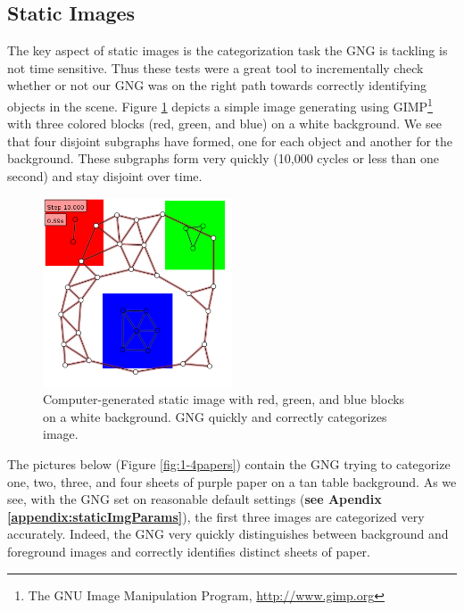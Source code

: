 \documentclass{article}
\renewcommand{\|}{\origbar} %
\begin{document}
\subsection{Static Images}


The key aspect of static images is the categorization task the GNG is tackling is not time sensitive. Thus these tests were a great tool to incrementally check whether or not our GNG was on the right path towards correctly identifying objects in the scene. Figure \ref{fig:rgbStatic} depicts a simple image generating using GIMP\footnote{The GNU Image Manipulation Program, \url{http://www.gimp.org}} with three colored blocks (red, green, and blue) on a white background. We see that four disjoint subgraphs have formed, one for each object and another for the background. These subgraphs form very quickly (10,000 cycles or less than one second) and stay disjoint over time. 

\begin{figure}[h!]
  \begin{center}
    \includegraphics[width=0.5\textwidth]{rgb_static.png}
  \end{center}
  \caption{Computer-generated static image with red, green, and blue blocks on a white background. GNG quickly and correctly categorizes image.}
  \label{fig:rgbStatic}
\end{figure}

The pictures below (Figure \ref{fig:1-4papers}) contain the GNG trying to categorize one, two, three, and four sheets of purple paper on a tan table background. As we see, with the GNG set on reasonable default settings ({\bf see Apendix \ref{appendix:staticImgParams}}), the first three images are categorized very accurately. Indeed, the GNG very quickly distinguishes between background and foreground images and correctly identifies distinct sheets of paper. 
\end{document}
